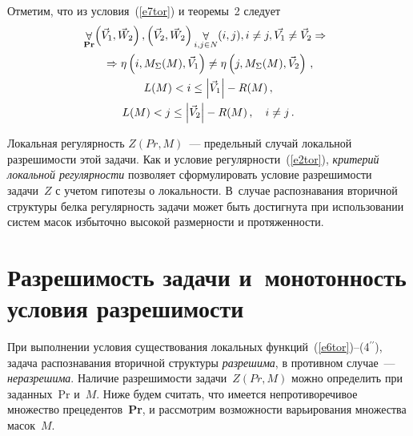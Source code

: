 \begin{multicols}{2}
Отметим, что из условия~(\ref{e7tor}) и теоремы~2 следует 
\begin{multline*}
\!\!\mathop{\forall}\limits_{\mathbf{Pr}}\! \left(\vec{V}_1,\vec{W}_2\right),\left 
(\vec{V}_2,\vec{W}_2\right)\mathop{\forall}\limits_{i,j\in N} (i,j), i\not=j, 
\vec{V_1}\not=\vec{V}_2\Rightarrow{}\\
{}\Rightarrow \eta\left(i, M_\Sigma(M), 
\vec{V}_1\right)\not=\eta \left( j, M_\Sigma(M), \vec{V}_2\right)\,,
\\
L(M)<i\leq \left |\vec{V}_1\right |-R(M)\,,\\ L(M) <j\leq \left |\vec{V}_2\right |-
R(M)\,,\quad i\not=j\,.
\end{multline*}

    Локальная регулярность $Z(Pr, M)$~--- предельный случай локальной 
разрешимости  этой задачи. Как и условие регулярности~(\ref{e2tor}), 
\textit{критерий локальной регулярности} позволяет сформулировать условие 
разрешимости задачи~$Z$ с учетом гипотезы о локальности. В~случае 
распознавания вторичной структуры белка регулярность задачи может быть 
достигнута при использовании систем масок избыточно высокой размерности и 
протяженности. 

\vspace*{6pt}

\section{Разрешимость задачи и~монотонность условия 
разрешимости}

При выполнении условия существования локальных 
функций~(\ref{e6tor})--(4$^{\prime\prime}$), задача распознавания вторичной 
структуры \textit{разрешима}, в противном случае~--- \textit{неразрешима}. 
Наличие разрешимости задачи~$Z(Pr,M)$ можно определить при заданных~Pr 
и~$M$. Ниже будем считать, что имеется непротиворечивое множество 
прецедентов~\textbf{Pr},  и рассмотрим возможности варьирования множества 
масок~$M$. 


\end{multicols}
